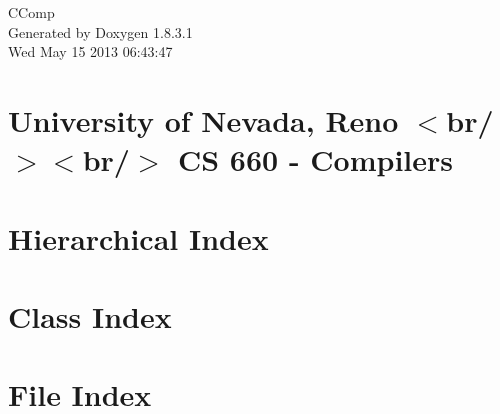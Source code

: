 \documentclass{book}
\begin{document}
\hypersetup{pageanchor=false,citecolor=blue}
\begin{titlepage}
\vspace*{7cm}
\begin{center}
{\Large C\-Comp }\\
\vspace*{1cm}
{\large Generated by Doxygen 1.8.3.1}\\
\vspace*{0.5cm}
{\small Wed May 15 2013 06:43:47}\\
\end{center}
\end{titlepage}
\clearemptydoublepage
{}
\tableofcontents
\clearemptydoublepage
{}
\hypersetup{pageanchor=true,citecolor=blue}
\chapter{University of Nevada, Reno $<$br/$>$$<$br/$>$ C\-S 660 -\/ Compilers}
\label{index}\hypertarget{index}{}
\chapter{Hierarchical Index}

\chapter{Class Index}

\chapter{File Index}

\end{document}
